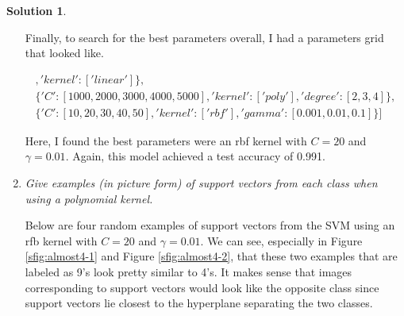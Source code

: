 \documentclass[12pt]{article}
\theoremstyle{definition}
\newtheorem*{solution*}{Solution}
\begin{document}
\begin{solution*}
\begin{enumerate}[label=\arabic*.,font=\upshape]
				Finally, to search for the best parameters overall, I had a parameters grid that looked like.
				
				\begin{align*}
				[\{'C':[0.05,0.1,0.2,0.15],'kernel':['linear']\},
				\\\{'C': [1000,2000,3000,4000,5000],
				'kernel':['poly'],'degree':[2,3,4]\},\\\{'C': [10,20,30,40,50],'kernel':['rbf'],'gamma':[0.001,0.01,0.1]\}]
				\end{align*}
				
				Here, I found the best parameters were an rbf kernel with $C = 20$ and $\gamma = 0.01$. Again, this model achieved a test accuracy of 0.991.
	
			\item \textit{ Give examples (in picture form) of support vectors from each class when using a polynomial
				kernel.}
			
			Below are four random examples of support vectors from the SVM using an rfb kernel with $C = 20$ and $\gamma = 0.01$. We can see, especially in Figure \ref{sfig:almost4-1} and Figure \ref{sfig:almost4-2}, that these two examples that are labeled as 9's look pretty similar to 4's. It makes sense that images corresponding to support vectors would look like the opposite class since support vectors lie closest to the hyperplane separating the two classes. 
			

\end{enumerate}
\end{solution*}
\end{document}
